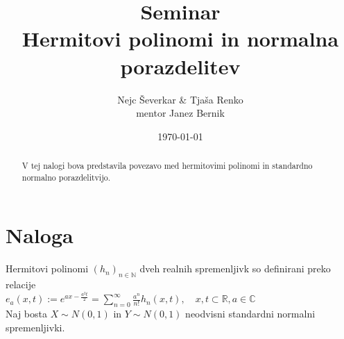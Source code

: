 \documentclass[ letterpaper, titlepage, fleqn]{article}
\begin{document}
\title{Seminar \\ Hermitovi polinomi in normalna porazdelitev}
\author{Nejc Ševerkar \& Tjaša Renko \\ mentor Janez Bernik}
\date{\today}
\maketitle

\begin{abstract}
\begin{center}
V tej nalogi bova predstavila povezavo med hermitovimi polinomi
in standardno normalno porazdelitvijo.
\end{center}
\end{abstract}

\section*{Naloga}
Hermitovi polinomi $(h_n)_{n \in \mathbb{N}}$ dveh realnih spremenljivk
so definirani preko relacije \\[10px]
$e_a(x, t) := e^{ax -\frac{a^2t}{2}} = \sum_{n=0}^{\infty} \frac{a^n}{n!} h_n(x, t), 
\quad {x, t} \subset \mathbb{R}, a \in \mathbb{C}$ \\[10px]
Naj bosta $X \sim N(0, 1)$ in $Y \sim N(0, 1)$ neodvisni standardni normalni spremenljivki.
\end{document}
